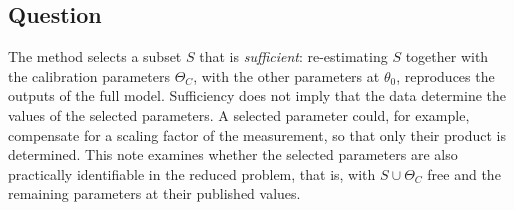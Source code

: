 
\subsection*{Question}
The method selects a subset $S$ that is \emph{sufficient}: re-estimating $S$ together with the calibration parameters $\Theta_C$, with the other parameters at $\theta_0$, reproduces the outputs of the full model. Sufficiency does not imply that the data determine the values of the selected parameters. A selected parameter could, for example, compensate for a scaling factor of the measurement, so that only their product is determined. This note examines whether the selected parameters are also practically identifiable in the reduced problem, that is, with $S\cup\Theta_C$ free and the remaining parameters at their published values.

